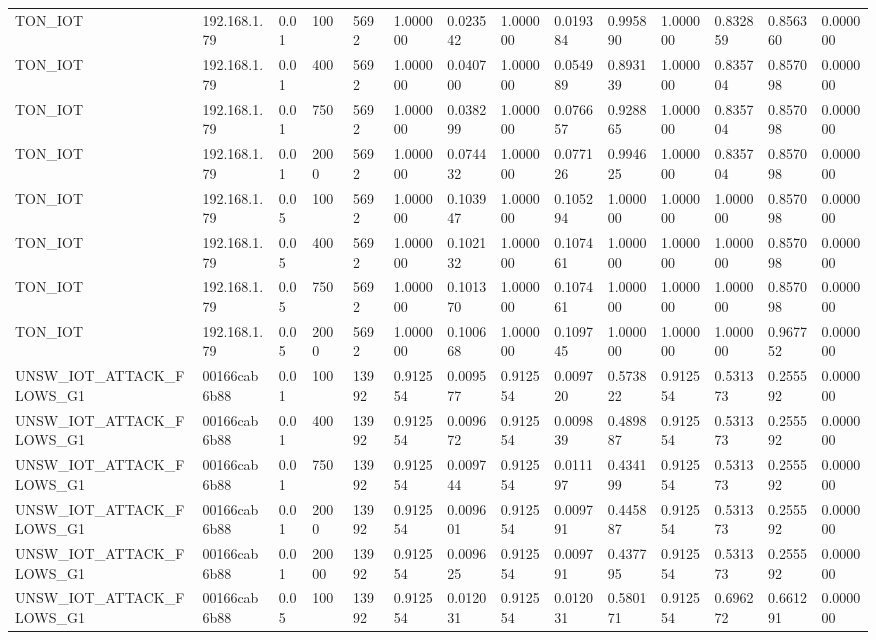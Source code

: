 \begin{tabular}{llllllllllllll}
TON\_IOT & 192.168.1.79 & 0.01 & 100 & 5692 & 1.000000 & 0.023542 & 1.000000 & 0.019384 & 0.995890 & 1.000000 & 0.832859 & 0.856360 & 0.000000 \\
TON\_IOT & 192.168.1.79 & 0.01 & 400 & 5692 & 1.000000 & 0.040700 & 1.000000 & 0.054989 & 0.893139 & 1.000000 & 0.835704 & 0.857098 & 0.000000 \\
TON\_IOT & 192.168.1.79 & 0.01 & 750 & 5692 & 1.000000 & 0.038299 & 1.000000 & 0.076657 & 0.928865 & 1.000000 & 0.835704 & 0.857098 & 0.000000 \\
TON\_IOT & 192.168.1.79 & 0.01 & 2000 & 5692 & 1.000000 & 0.074432 & 1.000000 & 0.077126 & 0.994625 & 1.000000 & 0.835704 & 0.857098 & 0.000000 \\
TON\_IOT & 192.168.1.79 & 0.05 & 100 & 5692 & 1.000000 & 0.103947 & 1.000000 & 0.105294 & 1.000000 & 1.000000 & 1.000000 & 0.857098 & 0.000000 \\
TON\_IOT & 192.168.1.79 & 0.05 & 400 & 5692 & 1.000000 & 0.102132 & 1.000000 & 0.107461 & 1.000000 & 1.000000 & 1.000000 & 0.857098 & 0.000000 \\
TON\_IOT & 192.168.1.79 & 0.05 & 750 & 5692 & 1.000000 & 0.101370 & 1.000000 & 0.107461 & 1.000000 & 1.000000 & 1.000000 & 0.857098 & 0.000000 \\
TON\_IOT & 192.168.1.79 & 0.05 & 2000 & 5692 & 1.000000 & 0.100668 & 1.000000 & 0.109745 & 1.000000 & 1.000000 & 1.000000 & 0.967752 & 0.000000 \\
UNSW\_IOT\_ATTACK\_FLOWS\_G1 & 00166cab6b88 & 0.01 & 100 & 13992 & 0.912554 & 0.009577 & 0.912554 & 0.009720 & 0.573822 & 0.912554 & 0.531373 & 0.255592 & 0.000000 \\
UNSW\_IOT\_ATTACK\_FLOWS\_G1 & 00166cab6b88 & 0.01 & 400 & 13992 & 0.912554 & 0.009672 & 0.912554 & 0.009839 & 0.489887 & 0.912554 & 0.531373 & 0.255592 & 0.000000 \\
UNSW\_IOT\_ATTACK\_FLOWS\_G1 & 00166cab6b88 & 0.01 & 750 & 13992 & 0.912554 & 0.009744 & 0.912554 & 0.011197 & 0.434199 & 0.912554 & 0.531373 & 0.255592 & 0.000000 \\
UNSW\_IOT\_ATTACK\_FLOWS\_G1 & 00166cab6b88 & 0.01 & 2000 & 13992 & 0.912554 & 0.009601 & 0.912554 & 0.009791 & 0.445887 & 0.912554 & 0.531373 & 0.255592 & 0.000000 \\
UNSW\_IOT\_ATTACK\_FLOWS\_G1 & 00166cab6b88 & 0.01 & 20000 & 13992 & 0.912554 & 0.009625 & 0.912554 & 0.009791 & 0.437795 & 0.912554 & 0.531373 & 0.255592 & 0.000000 \\
UNSW\_IOT\_ATTACK\_FLOWS\_G1 & 00166cab6b88 & 0.05 & 100 & 13992 & 0.912554 & 0.012031 & 0.912554 & 0.012031 & 0.580171 & 0.912554 & 0.696272 & 0.661291 & 0.000000 \\

\end{tabular}
